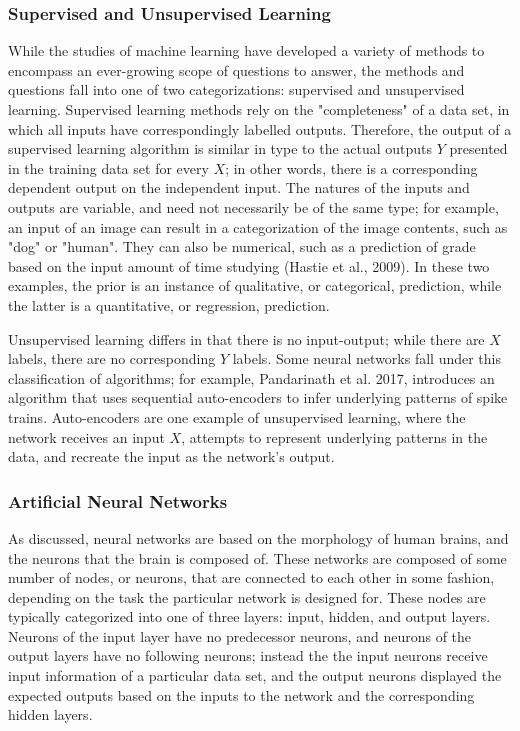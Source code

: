 \documentclass{article}
\begin{document}
\subsubsection{Supervised and Unsupervised Learning}
While the studies of machine learning have developed a variety of methods to encompass an ever-growing scope of questions to answer, the methods and questions fall into one of two categorizations: supervised and unsupervised learning. Supervised learning methods rely on the "completeness" of a data set, in which all inputs have correspondingly labelled outputs. Therefore, the output of a supervised learning algorithm is similar in type to the actual outputs $Y$ presented in the training data set for every $X$; in other words, there is a corresponding dependent output on the independent input. The natures of the inputs and outputs are variable, and need not necessarily be of the same type; for example, an input of an image can result in a categorization of the image contents, such as "dog" or "human". They can also be numerical, such as a prediction of grade based on the input amount of time studying (Hastie et al., 2009). In these two examples, the prior is an instance of qualitative, or categorical, prediction, while the latter is a quantitative, or regression, prediction.\par

Unsupervised learning differs in that there is no input-output; while there are $X$ labels, there are no corresponding $Y$ labels. Some neural networks fall under this classification of algorithms; for example, Pandarinath et al. 2017, introduces an algorithm that uses sequential auto-encoders to infer underlying patterns of spike trains. Auto-encoders are one example of unsupervised learning, where the network receives an input $X$, attempts to represent underlying patterns in the data, and recreate the input as the network's output. 

\subsubsection{Artificial Neural Networks}
As discussed, neural networks are based on the morphology of human brains, and the neurons that the brain is composed of. These networks are composed of some number of nodes, or neurons, that are connected to each other in some fashion, depending on the task the particular network is designed for. These nodes are typically categorized into one of three layers: input, hidden, and output layers. Neurons of the input layer have no predecessor neurons, and neurons of the output layers have no following neurons; instead the the input neurons receive input information of a particular data set, and the output neurons displayed the expected outputs based on the inputs to the network and the corresponding hidden layers.\par
\end{document}
